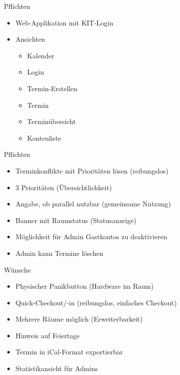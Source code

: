 \documentclass{sdqbeamer}
\begin{document}
\begin{frame}{Pflichten}
    \begin{itemize}
        \item Web-Applikation mit KIT-Login
        \item Ansichten
        \begin{itemize}
            \item Kalender
            \item Login
            \item Termin-Erstellen
            \item Termin
            \item Terminübersicht
            \item Kontenliste
        \end{itemize}
    \end{itemize}
\end{frame}

\begin{frame}{Pflichten}
    \begin{itemize}
        \item Terminkonflikte mit Prioritäten lösen (\textcolor{kit-orange100}{reibungslos})
        \item 3 Prioritäten (\textcolor{kit-green}{Übersichtlichkeit})
        \item Angabe, ob parallel nutzbar (\textcolor{kit-red100}{gemeinsame Nutzung})
        \item Banner mit Raumstatus (\textcolor{kit-lightgreen100}{Statusanzeige})
        \item Möglichkeit für Admin Gastkontos zu deaktivieren 
        \item Admin kann Termine löschen
    \end{itemize}
\end{frame}

\begin{frame}{Wünsche}
    \begin{itemize}
        \item Physischer Panikbutton (\textcolor{kit-purple100}{Hardware im Raum})
        \item Quick-Checkout/-in (\textcolor{kit-orange100}{reibungslos}, \textcolor{kit-purple100}{einfaches Checkout})
        \item Mehrere Räume möglich (Erweiterbarkeit)
        \item Hinweis auf Feiertage
        \item Termin in iCal-Format exportierbar
        \item Statistikansicht für Admins
    \end{itemize}
\end{frame}
\end{document}
